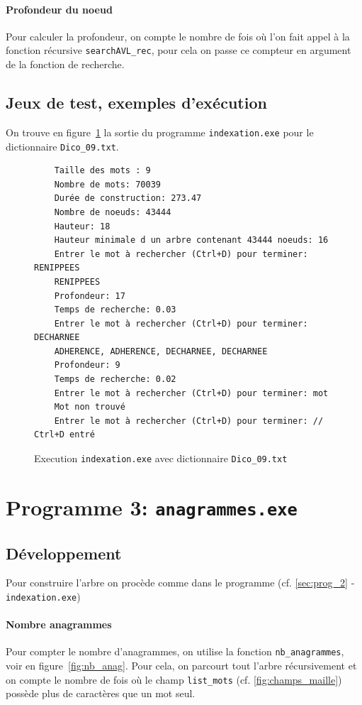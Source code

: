 \documentclass{article} %
\begin{document}
\paragraph{Profondeur du noeud} Pour calculer la profondeur, on compte le nombre de fois où l'on fait appel à la fonction récursive \texttt{searchAVL\_rec}, pour cela on passe ce compteur en argument de la fonction de recherche. 

\subsection{Jeux de test, exemples d'exécution}
On trouve en figure~\ref{fig:prog_2} la sortie du programme \texttt{indexation.exe} pour le dictionnaire \texttt{Dico\_09.txt}.

\begin{figure}[H]
  \begin{lstlisting}
    Taille des mots : 9
    Nombre de mots: 70039
    Durée de construction: 273.47 
    Nombre de noeuds: 43444
    Hauteur: 18
    Hauteur minimale d un arbre contenant 43444 noeuds: 16
    Entrer le mot à rechercher (Ctrl+D) pour terminer: RENIPPEES
    RENIPPEES
    Profondeur: 17
    Temps de recherche: 0.03
    Entrer le mot à rechercher (Ctrl+D) pour terminer: DECHARNEE
    ADHERENCE, ADHERENCE, DECHARNEE, DECHARNEE
    Profondeur: 9
    Temps de recherche: 0.02
    Entrer le mot à rechercher (Ctrl+D) pour terminer: mot
    Mot non trouvé
    Entrer le mot à rechercher (Ctrl+D) pour terminer: // Ctrl+D entré \end{lstlisting}
    \caption{Execution \texttt{indexation.exe} avec dictionnaire \texttt{Dico\_09.txt}}
    \label{fig:prog_2}
\end{figure}


\section{Programme 3: \texttt{anagrammes.exe}}
\subsection{Développement}
Pour construire l'arbre on procède comme dans le programme (cf. \ref{sec:prog_2} - \texttt{indexation.exe})

\paragraph{Nombre anagrammes} Pour compter le nombre d'anagrammes, on utilise la fonction \texttt{nb\_anagrammes}, voir en figure~\ref{fig:nb_anag}. Pour cela, on parcourt tout l'arbre récursivement et on compte le nombre de fois où le champ \texttt{list\_mots} (cf. \ref{fig:champs_maille}) possède plus de caractères que un mot seul. 
\end{document}
